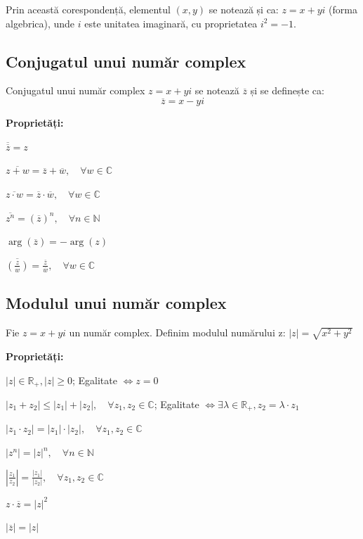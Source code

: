 \documentclass[11pt,a4paper]{article}
\begin{document}
Prin această corespondență, elementul \((x,y)\) se notează și ca:
$z = x + yi$ (forma algebrica), unde \(i\) este unitatea imaginară, cu proprietatea \(i^2 = -1\).
\subsection{Conjugatul unui număr complex}
Conjugatul unui număr complex \(z = x + yi\) se notează \(\overline{z}\) și se definește ca:
\[
\overline{z} = x - yi
\]

\textbf{Proprietăți:}  
\begin{Properties}
    \item \(\overline{\overline{z}} = z\)
    \item \(\overline{z + w} = \overline{z} + \overline{w}, \quad \forall w \in \mathbb{C}\)
    \item \(\overline{z \cdot w} = \overline{z} \cdot \overline{w}, \quad \forall w \in \mathbb{C}\)
    \item $\overline{z^n} = \left(\overline{z}\right)^n, \quad \forall n \in \mathbb{N}$
    \item $\arg\left(\overline{z}\right) = -\arg(z)$
    \item $\overline{\left(\frac{z}{w}\right)}=\frac{\overline{z}}{\overline{w}},\quad \forall w \in \mathbb{C}$
\end{Properties}
\subsection{Modulul unui număr complex}
Fie $z=x+yi$ un număr complex. Definim modulul numărului z: \quad $|z| = \sqrt{x^2 + y^2}$

\noindent\textbf{Proprietăți:}
\begin{Properties}
\item $|z| \in \mathbb{R}_+, |z|  \geq 0$; \quad Egalitate $\Leftrightarrow z=0$
\item $\left|z_1+z_2\right| \leq \left|z_1\right|+\left|z_2\right|, \quad \forall	z_1, z_2 \in \mathbb{C}$; \quad Egalitate $\Leftrightarrow \exists \lambda \in \mathbb{R}_+ , z_2 = \lambda \cdot z_1$
\item $\left|z_1 \cdot z_2\right| = \left|z_1\right| \cdot \left|z_2\right|, \quad \forall z_1, z_2 \in \mathbb{C}$
\item $\left|z^n\right| = |z|^n, \quad \forall n \in \mathbb{N}$
\item $\left|\frac{z_1}{z_2}\right| = \frac{\left|z_1\right|}{\left|z_2\right|}, \quad \forall z_1, z_2 \in \mathbb{C}$ 
 \item $z \cdot \overline{z} = |z|^2$
 \item $\left|\overline{z}\right| = |z|$
\end{Properties}
\end{document}

